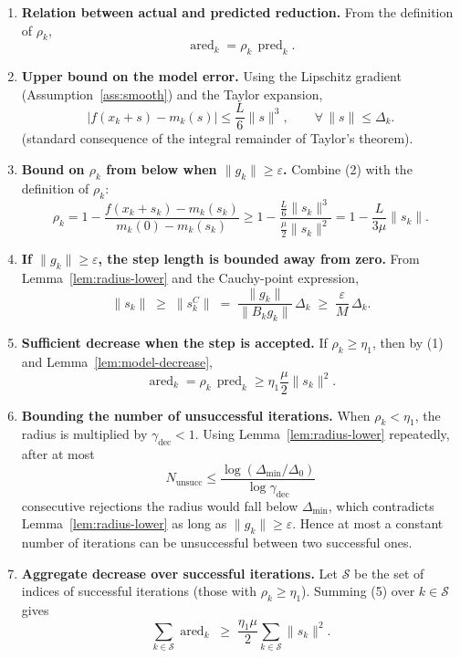 \documentclass{article}
\begin{document}
\begin{enumerate}
\item[Step 1.] \textbf{Relation between actual and predicted reduction.}  
From the definition of $\rho_k$,
\[
\operatorname{ared}_k = \rho_k\,\operatorname{pred}_k .
\tag{1}
\]

\item[Step 2.] \textbf{Upper bound on the model error.}  
Using the Lipschitz gradient (Assumption~\ref{ass:smooth}) and the Taylor expansion,
\[
\bigl|f(x_k+s)-m_k(s)\bigr|
\le \frac{L}{6}\|s\|^{3},
\qquad\forall\,\|s\|\le\Delta_k .
\tag{2}
\]
(standard consequence of the integral remainder of Taylor’s theorem).

\item[Step 3.] \textbf{Bound on $\rho_k$ from below when $\|g_k\|\ge\varepsilon$.}  
Combine (2) with the definition of $\rho_k$:
\[
\rho_k
=1-\frac{f(x_k+s_k)-m_k(s_k)}{m_k(0)-m_k(s_k)}
\ge 1-\frac{\tfrac{L}{6}\|s_k\|^{3}}{\tfrac{\mu}{2}\|s_k\|^{2}}
=1-\frac{L}{3\mu}\|s_k\|.
\tag{3}
\]

\item[Step 4.] \textbf{If $\|g_k\|\ge\varepsilon$, the step length is bounded away from zero.}  
From Lemma~\ref{lem:radius-lower} and the Cauchy-point expression,
\[
\|s_k\|\;\ge\;\|s_k^{C}\|
\;=\;\frac{\|g_k\|}{\|B_k g_k\|}\,\Delta_k
\;\ge\;\frac{\varepsilon}{M}\,\Delta_k .
\tag{4}
\]

\item[Step 5.] \textbf{Sufficient decrease when the step is accepted.}  
If $\rho_k\ge\eta_1$, then by (1) and Lemma~\ref{lem:model-decrease},
\[
\operatorname{ared}_k
= \rho_k\,\operatorname{pred}_k
\ge \eta_1\frac{\mu}{2}\|s_k\|^{2}.
\tag{5}
\]

\item[Step 6.] \textbf{Bounding the number of unsuccessful iterations.}  
When $\rho_k<\eta_1$, the radius is multiplied by $\gamma_{\text{dec}}<1$.  
Using Lemma~\ref{lem:radius-lower} repeatedly, after at most
\[
N_{\text{unsucc}} \le 
\frac{\log(\Delta_{\min}/\Delta_{0})}{\log\gamma_{\text{dec}}}
\tag{6}
\]
consecutive rejections the radius would fall below $\Delta_{\min}$, which contradicts Lemma~\ref{lem:radius-lower} as long as $\|g_k\|\ge\varepsilon$. Hence at most a constant number of iterations can be unsuccessful between two successful ones.

\item[Step 7.] \textbf{Aggregate decrease over successful iterations.}  
Let $\mathcal{S}$ be the set of indices of successful iterations (those with $\rho_k\ge\eta_1$). Summing (5) over $k\in\mathcal{S}$ gives
\[
\sum_{k\in\mathcal{S}}\operatorname{ared}_k
\;\ge\;\frac{\eta_1\mu}{2}\sum_{k\in\mathcal{S}}\|s_k\|^{2}.
\tag{7}
\]


\end{enumerate}
\end{document}
